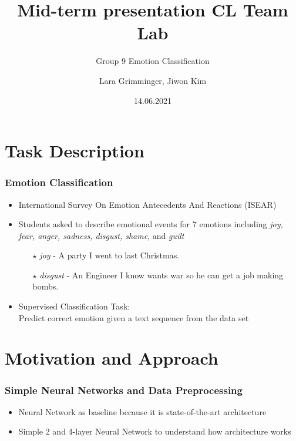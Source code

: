 \documentclass[aspectratio=169]{beamer}
\title[Mid-term presentation CL Team Lab]
{Mid-term presentation CL Team Lab}
\subtitle{Group 9 Emotion Classification}
\author{Lara Grimminger, Jiwon Kim}
\date{14.06.2021}
\begin{document}
\begin{frame}
\maketitle
\end{frame}

\section{Task Description}


\begin{frame}
\frametitle{Emotion Classification}

\begin{itemize}
\setlength\itemsep{1em}
\item International Survey On Emotion Antecedents And Reactions (ISEAR)
\item Students asked to describe emotional events for 7 emotions including \emph{joy, fear, anger, sadness, disgust, shame}, and \emph{guilt}
\hspace{+5mm}
\begin{itemize}
\setlength\itemsep{0.3em}
\item [$\star$]\emph{joy} - A party I went to last Christmas.
\item [$\star$]\emph{disgust} - An Engineer I know wants war so he can get a job making bombs.

\end{itemize}

\item Supervised Classification Task:\\ Predict correct emotion given a text sequence from the data set

\end{itemize}

\end{frame}


\section{Motivation and Approach}

\begin{frame}
\frametitle{Simple Neural Networks and Data Preprocessing}
\begin{itemize}

\item Neural Network as baseline because it is state-of-the-art architecture
\item Simple 2 and 4-layer Neural Network to understand how architecture works


\end{itemize}
\end{frame}
\end{document}
